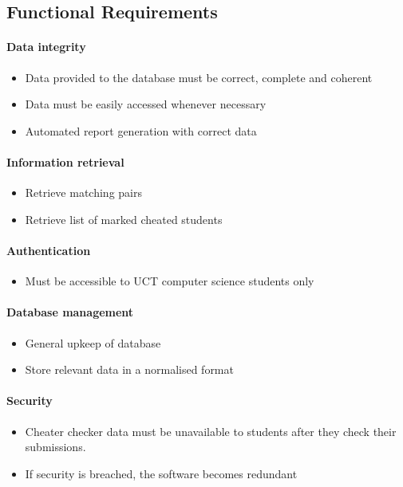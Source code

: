 \documentclass[11pt,a4paper]{article}
\begin{document}
\subsection{Functional Requirements}

\paragraph{Data integrity}
\begin{itemize}
    \item Data provided to the database must be correct, complete and coherent
    \item Data must be easily accessed whenever necessary
    \item Automated report generation with correct data
\end{itemize}

\paragraph{Information retrieval}
\begin{itemize}
    \item Retrieve matching pairs
    \item Retrieve list of marked cheated students
\end{itemize}

\paragraph{Authentication}
\begin{itemize}
    \item Must be accessible to UCT computer science students only
\end{itemize}

\paragraph{Database management}
\begin{itemize}
    \item General upkeep of database
    \item Store relevant data in a normalised format
\end{itemize}

\paragraph{Security}
\begin{itemize}
    \item Cheater checker data must be unavailable to students after they check their submissions.
    \item If security is breached, the software becomes redundant
\end{itemize}
\end{document}
